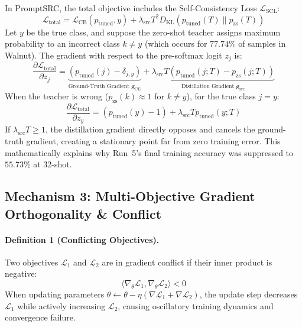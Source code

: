 \documentclass[letterpaper,11pt,leqno]{article}
\begin{document}
In PromptSRC, the total objective includes the Self-Consistency Loss $\mathcal{L}_\mathrm{SCL}$:
\begin{equation}
    \mathcal{L}_\mathrm{total} = \mathcal{L}_\mathrm{CE}(p_\mathrm{tuned}, y) + \lambda_\mathrm{src} T^2 D_\mathrm{KL}(p_\mathrm{tuned}(T) \parallel p_\mathrm{zs}(T))
\end{equation}
Let $y$ be the true class, and suppose the zero-shot teacher assigns maximum probability to an incorrect class $k \neq y$ (which occurs for $77.74\%$ of samples in Walnut). The gradient with respect to the pre-softmax logit $z_j$ is:
\begin{equation}
    \frac{\partial \mathcal{L}_\mathrm{total}}{\partial z_j} = \underbrace{(p_\mathrm{tuned}(j) - \delta_{j, y})}_{\text{Ground-Truth Gradient } \mathbf{g}_\mathrm{CE}} + \underbrace{\lambda_\mathrm{src} T (p_\mathrm{tuned}(j; T) - p_\mathrm{zs}(j; T))}_{\text{Distillation Gradient } \mathbf{g}_\mathrm{src}}
\end{equation}
When the teacher is wrong ($p_\mathrm{zs}(k) \approx 1$ for $k \neq y$), for the true class $j=y$:
\begin{equation}
    \frac{\partial \mathcal{L}_\mathrm{total}}{\partial z_y} = (p_\mathrm{tuned}(y) - 1) + \lambda_\mathrm{src} T p_\mathrm{tuned}(y; T)
\end{equation}
If $\lambda_\mathrm{src} T \ge 1$, the distillation gradient directly opposes and cancels the ground-truth gradient, creating a stationary point far from zero training error. This mathematically explains why Run~5's final training accuracy was suppressed to $55.73\%$ at 32-shot.

\subsection{Mechanism 3: Multi-Objective Gradient Orthogonality \& Conflict}

\paragraph{Definition 1 (Conflicting Objectives).}
Two objectives $\mathcal{L}_1$ and $\mathcal{L}_2$ are in gradient conflict if their inner product is negative:
\begin{equation}
    \langle \nabla_\theta \mathcal{L}_1, \nabla_\theta \mathcal{L}_2 \rangle < 0
\end{equation}
When updating parameters $\theta \leftarrow \theta - \eta (\nabla \mathcal{L}_1 + \nabla \mathcal{L}_2)$, the update step decreases $\mathcal{L}_1$ while actively increasing $\mathcal{L}_2$, causing oscillatory training dynamics and convergence failure.
\end{document}
